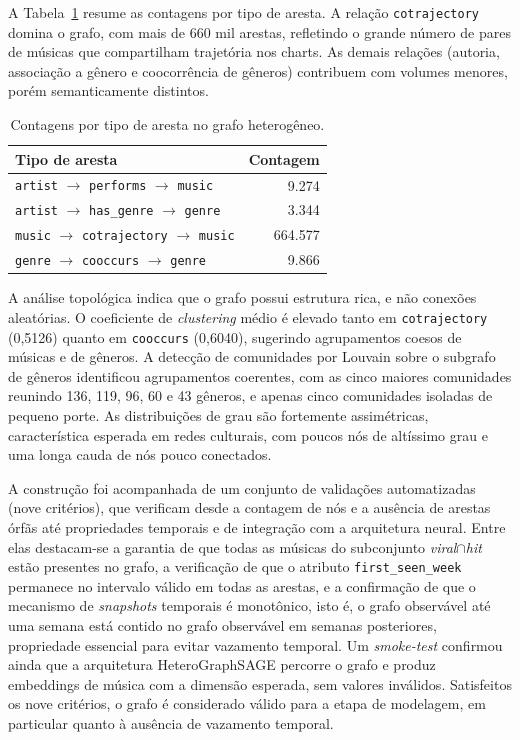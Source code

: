A Tabela~\ref{tab:phase1-edges} resume as contagens por tipo de aresta. A relação \texttt{cotrajectory} domina o grafo, com mais de 660 mil arestas, refletindo o grande número de pares de músicas que compartilham trajetória nos charts. As demais relações (autoria, associação a gênero e coocorrência de gêneros) contribuem com volumes menores, porém semanticamente distintos.

\begin{table}[htbp]
\centering
\caption{Contagens por tipo de aresta no grafo heterogêneo.}
\label{tab:phase1-edges}
\begin{tabular}{p{7.0cm}r}
\hline
\textbf{Tipo de aresta} & \textbf{Contagem} \\
\hline
\texttt{artist} $\to$ \texttt{performs} $\to$ \texttt{music} & 9.274 \\
\texttt{artist} $\to$ \texttt{has\_genre} $\to$ \texttt{genre} & 3.344 \\
\texttt{music} $\to$ \texttt{cotrajectory} $\to$ \texttt{music} & 664.577 \\
\texttt{genre} $\to$ \texttt{cooccurs} $\to$ \texttt{genre} & 9.866 \\
\hline
\end{tabular}
\end{table}

A análise topológica indica que o grafo possui estrutura rica, e não conexões aleatórias. O coeficiente de \textit{clustering} médio é elevado tanto em \texttt{cotrajectory} (0,5126) quanto em \texttt{cooccurs} (0,6040), sugerindo agrupamentos coesos de músicas e de gêneros. A detecção de comunidades por Louvain sobre o subgrafo de gêneros identificou agrupamentos coerentes, com as cinco maiores comunidades reunindo 136, 119, 96, 60 e 43 gêneros, e apenas cinco comunidades isoladas de pequeno porte. As distribuições de grau são fortemente assimétricas, característica esperada em redes culturais, com poucos nós de altíssimo grau e uma longa cauda de nós pouco conectados.


A construção foi acompanhada de um conjunto de validações automatizadas (nove critérios), que verificam desde a contagem de nós e a ausência de arestas órfãs até propriedades temporais e de integração com a arquitetura neural. Entre elas destacam-se a garantia de que todas as músicas do subconjunto \emph{viral$\cap$hit} estão presentes no grafo, a verificação de que o atributo \texttt{first\_seen\_week} permanece no intervalo válido em todas as arestas, e a confirmação de que o mecanismo de \textit{snapshots} temporais é monotônico, isto é, o grafo observável até uma semana está contido no grafo observável em semanas posteriores, propriedade essencial para evitar vazamento temporal. Um \emph{smoke-test} confirmou ainda que a arquitetura HeteroGraphSAGE percorre o grafo e produz embeddings de música com a dimensão esperada, sem valores inválidos. Satisfeitos os nove critérios, o grafo é considerado válido para a etapa de modelagem, em particular quanto à ausência de vazamento temporal.

